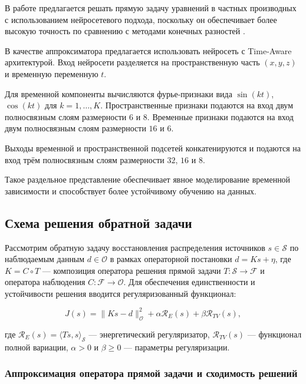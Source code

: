 \documentclass[a4paper,14pt,oneside,openany]{extarticle}
\begin{document}
В работе предлагается решать прямую задачу уравнений в частных производных 
с использованием нейросетевого подхода, поскольку он обеспечивает
более высокую точность по сравнению с методами конечных разностей \cite{Pei2025}.  

В качестве аппроксиматора предлагается использовать нейросеть с Time-Aware архитектурой.  
Вход нейросети разделяется на пространственную часть \((x, y, z)\) и временную переменную \(t\).  

Для временной компоненты вычисляются фурье‑признаки вида \(\sin(kt)\), \(\cos(kt)\) для \(k = 1, \dots, K\).  
Пространственные признаки подаются на вход двум полносвязным слоям размерности \(6\) и \(8\).  
Временные признаки подаются на вход двум полносвязным слоям размерности \(16\) и \(6\).  

Выходы временной и пространственной подсетей конкатенируются 
и подаются на вход трём полносвязным слоям размерности \(32\), \(16\) и \(8\).  

Такое раздельное представление обеспечивает явное моделирование 
временной зависимости и способствует более устойчивому обучению на данных.

\subsection{Схема решения обратной задачи}

Рассмотрим обратную задачу восстановления распределения источников $s \in \mathcal{S}$ 
по наблюдаемым данным $d \in \mathcal{O}$ в рамках операторной постановки $d = Ks + \eta$, 
где $K = C \circ T$ --- композиция оператора решения прямой задачи $T: \mathcal{S} \to \mathcal{F}$ 
и оператора наблюдения $C: \mathcal{F} \to \mathcal{O}$. Для обеспечения единственности и 
устойчивости решения вводится регуляризованный функционал:

\begin{equation}
    J(s) = \|Ks - d\|_{\mathcal{O}}^2 + \alpha \mathcal{R}_E(s) + \beta \mathcal{R}_{TV}(s),
\end{equation}

где $\mathcal{R}_E(s) = \langle Ts, s \rangle_{\mathcal{S}}$ --- энергетический регуляризатор, 
$\mathcal{R}_{TV}(s)$ --- функционал полной вариации, $\alpha > 0$ и $\beta \geq 0$ --- параметры регуляризации.

\subsubsection{Аппроксимация оператора прямой задачи и сходимость решений}
\end{document}
